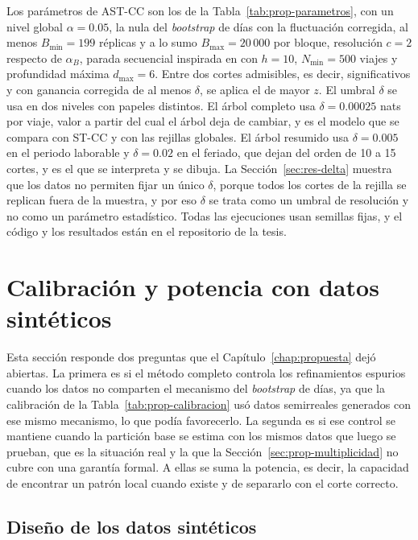 Los parámetros de AST-CC son los de la Tabla~\ref{tab:prop-parametros}, con un
nivel global $\alpha = 0.05$, la nula del \emph{bootstrap} de días con la
fluctuación corregida, al menos $B_{\min} = 199$ réplicas y a lo sumo
$B_{\max} = 20\,000$ por bloque, resolución $c = 2$ respecto de $\alpha_B$, parada
secuencial inspirada en \citet{Besag1991} con $h = 10$, $N_{\min} = 500$ viajes y
profundidad máxima $d_{\max} = 6$. Entre dos cortes admisibles, es decir,
significativos y con ganancia corregida de al menos $\delta$, se aplica el de mayor
$z$. El umbral $\delta$ se usa en dos niveles con papeles distintos. El árbol
completo usa $\delta = 0.00025$ nats por viaje, valor a partir del cual el árbol
deja de cambiar, y es el modelo que se compara con ST-CC y con las rejillas
globales. El árbol resumido usa $\delta = 0.005$ en el periodo laborable y
$\delta = 0.02$ en el feriado, que dejan del orden de 10 a 15 cortes, y es el que
se interpreta y se dibuja. La Sección~\ref{sec:res-delta} muestra que los datos no
permiten fijar un único $\delta$, porque todos los cortes de la rejilla se
replican fuera de la muestra, y por eso $\delta$ se trata como un umbral de
resolución y no como un parámetro estadístico. Todas las ejecuciones usan
semillas fijas, y el código y los resultados están en el repositorio de la tesis.

\section{Calibración y potencia con datos sintéticos}\label{sec:res-sinteticos}

Esta sección responde dos preguntas que el Capítulo~\ref{chap:propuesta} dejó
abiertas. La primera es si el método completo controla los refinamientos espurios
cuando los datos no comparten el mecanismo del \emph{bootstrap} de días, ya que la
calibración de la Tabla~\ref{tab:prop-calibracion} usó datos semirreales generados
con ese mismo mecanismo, lo que podía favorecerlo. La segunda es si ese control se
mantiene cuando la partición base se estima con los mismos datos que luego se
prueban, que es la situación real y la que la Sección~\ref{sec:prop-multiplicidad}
no cubre con una garantía formal. A ellas se suma la potencia, es decir, la
capacidad de encontrar un patrón local cuando existe y de separarlo con el corte
correcto.

\subsection{Diseño de los datos sintéticos}

